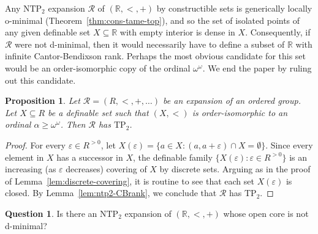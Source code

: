 \documentclass[12pt]{article}
\newcommand{\Rr}{\mathcal{R}}
\newcommand{\R}{\mathbb{R}}
\newcommand{\NTP}{\ensuremath{\mathrm{NTP}_2}}
\newcommand{\TP}{\ensuremath{\mathrm{TP}_2}}
\newtheorem{proposition}[theorem]{Proposition}
\theoremstyle{definition}
\newtheorem{question}[theorem]{Question}
\theoremstyle{remark}
\begin{document}
Any $\NTP$ expansion $\Rr$ of $(\R,<,+)$ by constructible sets is generically locally o-minimal (Theorem~\ref{thm:cons-tame-top}), and so the set of isolated points of any given definable set $X\subseteq \R$ with empty interior is dense in $X$. Consequently, if $\Rr$ were not d-minimal, then it would necessarily have to define a subset of $\R$ with infinite Cantor-Bendixson rank. Perhaps the most obvious candidate for this set would be an order-isomorphic copy of the ordinal $\omega^\omega$. We end the paper by ruling out this candidate. 

\begin{proposition}\label{prop:omega}
Let $\Rr=(R,<,+,\ldots)$ be an expansion of an ordered group. Let $X\subseteq R$ be a definable set such that $(X,<)$ is order-isomorphic to an ordinal $\alpha\geq \omega^\omega$. Then $\Rr$ has $\TP$. 
\end{proposition}
\begin{proof}
For every $\varepsilon\in R^{>0}$, let $X(\varepsilon)=\{ a \in X : (a,a+\varepsilon)\cap X=\emptyset\}$. Since every element in $X$ has a successor in $X$, the definable family $\{ X(\varepsilon) : \varepsilon \in R^{>0}\}$ is an increasing (as $\varepsilon$ decreases) covering of $X$ by discrete sets. Arguing as in the proof of Lemma~\ref{lem:discrete-covering}, it is routine to see that each set $X(\varepsilon)$ is closed. By Lemma~\ref{lem:ntp2-CBrank}, we conclude that $\Rr$ has $\TP$. 
\end{proof}

\begin{question}\label{Q:d-minimal}
Is there an $\NTP$ expansion of $(\R,<,+)$ whose open core is not d-minimal? 
\end{question}



\end{document}
